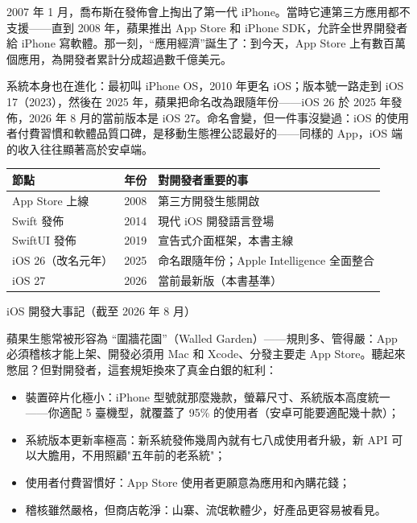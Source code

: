 


2007 年 1 月，喬布斯在發佈會上掏出了第一代 iPhone。當時它連第三方應用都不支援——直到 2008 年，蘋果推出 App Store 和 iPhone SDK，允許全世界開發者給 iPhone 寫軟體。那一刻，“應用經濟”誕生了：到今天，App Store 上有數百萬個應用，為開發者累計分成超過數千億美元。

系統本身也在進化：最初叫 iPhone OS，2010 年更名 iOS；版本號一路走到 iOS 17（2023），然後在 2025 年，蘋果把命名改為跟隨年份——iOS 26 於 2025 年發佈，2026 年 8 月的當前版本是 iOS 27。命名會變，但一件事沒變過：iOS 的使用者付費習慣和軟體品質口碑，是移動生態裡公認最好的——同樣的 App，iOS 端的收入往往顯著高於安卓端。

\begin{center}
\begin{tabularx}{\linewidth}{|X|X|X|}
\hline
\textbf{節點} & \textbf{年份} & \textbf{對開發者重要的事} \tabularnewline
\hline
App Store 上線 & 2008 & 第三方開發生態開啟 \tabularnewline
Swift 發佈 & 2014 & 現代 iOS 開發語言登場 \tabularnewline
SwiftUI 發佈 & 2019 & 宣告式介面框架，本書主線 \tabularnewline
iOS 26（改名元年） & 2025 & 命名跟隨年份；Apple Intelligence 全面整合 \tabularnewline
iOS 27 & 2026 & 當前最新版（本書基準） \tabularnewline
\hline
\end{tabularx}
\end{center}

\begin{center}\small\color{gray}iOS 開發大事記（截至 2026 年 8 月）\end{center}


蘋果生態常被形容為 “圍牆花園”（Walled Garden）——規則多、管得嚴：App 必須稽核才能上架、開發必須用 Mac 和 Xcode、分發主要走 App Store。聽起來憋屈？但對開發者，這套規矩換來了真金白銀的紅利：

\begin{itemize}
  \item 裝置碎片化極小：iPhone 型號就那麼幾款，螢幕尺寸、系統版本高度統一——你適配 5 臺機型，就覆蓋了 95\% 的使用者（安卓可能要適配幾十款）；
  \item 系統版本更新率極高：新系統發佈幾周內就有七八成使用者升級，新 API 可以大膽用，不用照顧"五年前的老系統"；
  \item 使用者付費習慣好：App Store 使用者更願意為應用和內購花錢；
  \item 稽核雖然嚴格，但商店乾淨：山寨、流氓軟體少，好產品更容易被看見。
\end{itemize}

